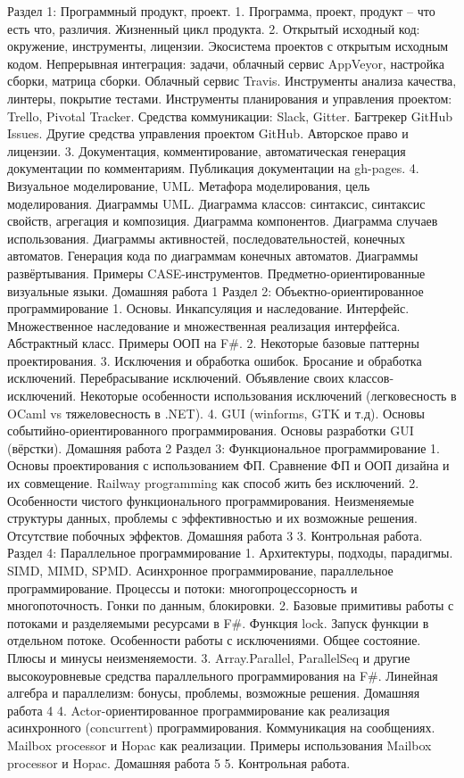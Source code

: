 Раздел 1: Программный продукт, проект.
    1. Программа, проект, продукт – что есть что, различия. Жизненный цикл продукта.
    2. Открытый исходный код: окружение, инструменты, лицензии. Экосистема проектов с открытым исходным кодом. Непрерывная интеграция: задачи, облачный сервис AppVeyor, настройка сборки, матрица сборки. Облачный сервис Travis. Инструменты анализа качества, линтеры, покрытие тестами. Инструменты планирования и управления проектом: Trello, Pivotal Tracker. Средства коммуникации: Slack, Gitter. Багтрекер GitHub Issues. Другие средства управления проектом GitHub. Авторское право и лицензии.
    3. Документация, комментирование, автоматическая генерация документации по комментариям. Публикация документации на gh-pages.
    4. Визуальное моделирование, UML. Метафора моделирования, цель моделирования. Диаграммы UML. Диаграмма классов: синтаксис, синтаксис свойств, агрегация и композиция. Диаграмма компонентов. Диаграмма случаев использования. Диаграммы активностей, последовательностей, конечных автоматов. Генерация кода по диаграммам конечных автоматов. Диаграммы развёртывания. Примеры CASE-инструментов. Предметно-ориентированные визуальные языки.
Домашняя работа 1
Раздел 2: Объектно-ориентированное программирование
    1. Основы. Инкапсуляция и наследование. Интерфейс. Множественное наследование и множественная реализация интерфейса. Абстрактный класс. Примеры ООП на F#. 
    2. Некоторые базовые паттерны проектирования.
    3. Исключения и обработка ошибок. Бросание и обработка исключений. Перебрасывание исключений. Объявление своих классов-исключений. Некоторые особенности использования исключений (легковесность в OCaml vs тяжеловесность в .NET).
    4. GUI (winforms, GTK и т.д). Основы событийно-ориентированного программирования. Основы разработки GUI (вёрстки).
Домашняя работа 2
Раздел 3: Функциональное программирование
    1. Основы проектирования с использованием ФП. Сравнение ФП и ООП дизайна и их совмещение.  Railway programming как способ жить без исключений. 
    2. Особенности чистого функционального программирования. Неизменяемые структуры данных, проблемы с эффективностью и их возможные решения. Отсутствие побочных эффектов.
Домашняя работа 3 
    3. Контрольная работа.
Раздел 4: Параллельное программирование
    1. Архитектуры, подходы, парадигмы. SIMD, MIMD, SPMD. Асинхронное программирование, параллельное программирование. Процессы и потоки: многопроцессорность и многопоточность. Гонки по данным, блокировки.  
    2. Базовые примитивы работы с потоками и разделяемыми ресурсами в F#. Функция lock. Запуск функции в отдельном потоке. Особенности работы с исключениями. Общее состояние. Плюсы и минусы неизменяемости.
    3. Array.Parallel, ParallelSeq и другие высокоуровневые средства параллельного программирования на F#. Линейная алгебра и параллелизм: бонусы, проблемы, возможные решения.
Домашняя работа 4
    4. Actor-ориентированное программирование как реализация асинхронного (concurrent) программирования. Коммуникация на сообщениях. Mailbox processor и Hopac как реализации. Примеры использования Mailbox processor и Hopac.
Домашняя работа 5
    5. Контрольная работа.

